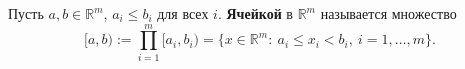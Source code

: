 \label{definition:11}

\begin{definition}
Пусть $a,b\in\mathbb R^m$, $a_i\le b_i$ для всех $i$.
\textbf{Ячейкой} в $\mathbb R^m$ называется множество
\[
  [a,b):=\prod_{i=1}^{m}[a_i,b_i)
  =\{x\in\mathbb R^m:\ a_i\le x_i<b_i,\ i=1,\ldots,m\}.
\]
\end{definition}
